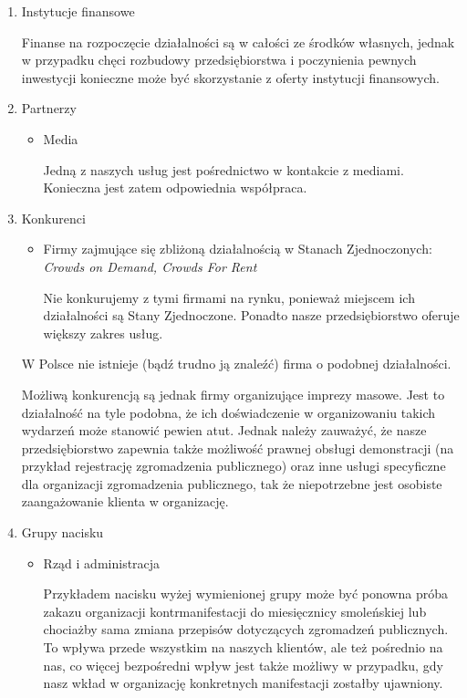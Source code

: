 \documentclass{article}
\begin{document}
\begin{enumerate}
\begin{itemize}
	
	\end{itemize}
\item Instytucje finansowe

Finanse na rozpoczęcie działalności są w całości ze środków własnych, jednak w przypadku chęci rozbudowy przedsiębiorstwa i poczynienia pewnych inwestycji konieczne może być skorzystanie z oferty instytucji finansowych.

\item Partnerzy
	\begin{itemize}
	\item Media
	
	Jedną z naszych usług jest pośrednictwo w kontakcie z mediami. Konieczna jest zatem odpowiednia współpraca.
	
	\end{itemize}

\item Konkurenci
	\begin{itemize}
	\item Firmy zajmujące się zbliżoną działalnością w Stanach Zjednoczonych: \textit{Crowds on Demand, Crowds For Rent}
	
	Nie konkurujemy z tymi firmami na rynku, ponieważ miejscem ich działalności są Stany Zjednoczone. Ponadto nasze przedsiębiorstwo oferuje większy zakres usług.
	
	\end{itemize}
	W Polsce nie istnieje (bądź trudno ją znaleźć) firma o podobnej działalności.
	
	Możliwą konkurencją są jednak firmy organizujące imprezy masowe. Jest to działalność na tyle podobna, że ich doświadczenie w organizowaniu takich wydarzeń może stanowić pewien atut. Jednak należy zauważyć, że nasze przedsiębiorstwo zapewnia także możliwość prawnej obsługi demonstracji (na przykład rejestrację zgromadzenia publicznego) oraz inne usługi specyficzne dla organizacji zgromadzenia publicznego, tak że niepotrzebne jest osobiste zaangażowanie klienta w organizację.
\item Grupy nacisku
	\begin{itemize}
	\item Rząd i administracja
	
	Przykładem nacisku wyżej wymienionej grupy może być ponowna próba zakazu organizacji kontrmanifestacji do miesięcznicy smoleńskiej lub chociażby sama zmiana przepisów dotyczących zgromadzeń publicznych. To wpływa przede wszystkim na naszych klientów, ale też pośrednio na nas, co więcej bezpośredni wpływ jest także możliwy w przypadku, gdy nasz wkład w organizację konkretnych manifestacji zostałby ujawniony.


\end{itemize}
\end{enumerate}
\end{document}

